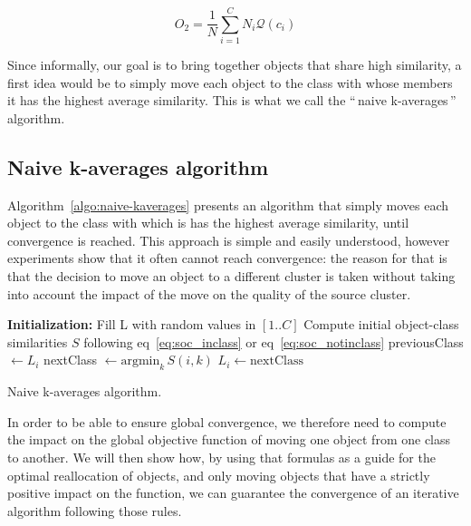\documentclass[a4paper,twoside]{article}
\newcommand{\gl}[1]{``\,#1\,''} %
\begin{document}
\[
O_2 = \frac{1}{N} \sum_{i=1}^{C} N_i \mathcal{Q}(c_i)
\]

Since informally, our goal is to bring together objects that share high similarity, a first idea would be to simply move each object to the class with whose members it has the highest average similarity. This is what we call the \gl{naive k-averages} algorithm.

\subsection{Naive k-averages algorithm}

Algorithm~\ref{algo:naive-kaverages} presents an algorithm that simply moves each object to the class with which is has the highest average similarity, until convergence is reached. This approach is simple and easily understood, however experiments show that it often cannot reach convergence: the reason for that is that the decision to move an object to a different cluster is taken without taking into account the impact of the move on the quality of the source cluster.

\begin{algorithm}
	\label{algo:naive-kaverages}
	\SetAlgoLined
	\BlankLine	
	\textbf{Initialization:} 
		Fill L with random values in $[1..C]$\;
		Compute initial object-class similarities $S$ following eq~\ref{eq:soc_inclass} or eq~\ref{eq:soc_notinclass}\;
	\BlankLine	
	 {
		 {
			previousClass $\leftarrow L_i$\;
			nextClass $\leftarrow \mathrm{argmin}_k\, S(i, k)$
			 {
				$L_i \leftarrow \mathrm{nextClass}$\;
			}
		}
	}
	\BlankLine
	\caption{Naive k-averages algorithm.}
\end{algorithm}

In order to be able to ensure global convergence, we therefore need to compute the impact on the global objective function of moving one object from one class to another. We will then show how, by using that formulas as a guide for the optimal reallocation of objects, and only moving objects that have a strictly positive impact on the function, we can guarantee the convergence of an iterative algorithm following those rules.
\end{document}
